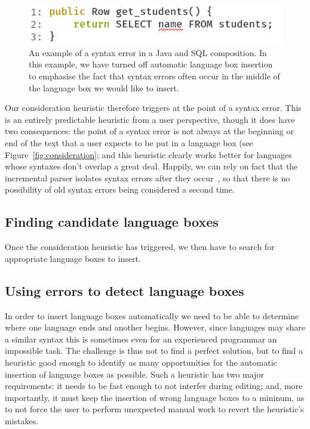\documentclass[sigplan,screen]{acmart}\settopmatter{printfolios=true,printccs=false,printacmref=false}
\begin{document}
\begin{figure}
    \includegraphics[width=.45\textwidth]{images/composition_error1.png}
    \caption{An example of a syntax error in a Java and SQL composition. In
      this example, we have turned off automatic language box insertion to
      emphasise the fact that syntax errors often occur in the middle of the
      language box we would like to insert.}
\label{fig_heuristic_example}
\end{figure}

Our consideration heuristic therefore triggers at the point of a syntax error.
This is an entirely predictable heuristic from a user perspective, though it
does have two consequences: the point of a syntax error is not always at the
beginning or end of the text that a user expects to be put in a language box
(see Figure~\ref{fig:consideration}; and this heuristic clearly works better
for languages whose syntaxes don't overlap a great deal. Happily, we can rely
on fact that the incremental parser isolates syntax errors after they
occur~\cite[p.~93]{wagner98practicalalgorithms}, so that there is no
possibility of old syntax errors being considered a second time.


\subsection{Finding candidate language boxes}

Once the consideration heuristic has triggered, we then have to search for
appropriate language boxes to insert.


\subsection{Using errors to detect language boxes}
\label{sec_finding_lbox_candidates}

In order to insert language boxes automatically we need to be able to determine
where one language ends and another begins. However, since languages may share
a similar syntax this is sometimes even for an experienced programmar an
impossible task. The challenge is thus not to find a perfect solution, but to
find a heuristic good enough to identify as many opportunities for the
automatic insertion of language boxes as possible. Such a heuristic has two
major requirements: it needs to be fast enough to not interfer during editing;
and, more importantly, it must keep the insertion of wrong language boxes to a
mininum, as to not force the user to perform unexpected manual work to revert
the heuristic's mistakes.
\end{document}
